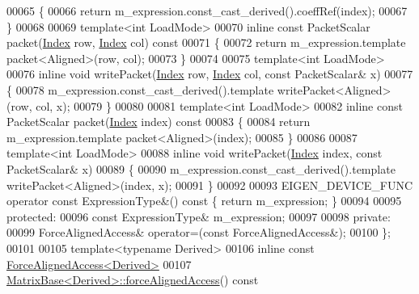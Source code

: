 \begin{DoxyCode}
00065     \{
00066       \textcolor{keywordflow}{return} m\_expression.const\_cast\_derived().coeffRef(index);
00067     \}
00068 
00069     \textcolor{keyword}{template}<\textcolor{keywordtype}{int} LoadMode>
00070     \textcolor{keyword}{inline} \textcolor{keyword}{const} PacketScalar packet(\hyperlink{namespace_eigen_a62e77e0933482dafde8fe197d9a2cfde}{Index} row, \hyperlink{namespace_eigen_a62e77e0933482dafde8fe197d9a2cfde}{Index} col)\textcolor{keyword}{ const}
00071 \textcolor{keyword}{    }\{
00072       \textcolor{keywordflow}{return} m\_expression.template packet<Aligned>(row, col);
00073     \}
00074 
00075     \textcolor{keyword}{template}<\textcolor{keywordtype}{int} LoadMode>
00076     \textcolor{keyword}{inline} \textcolor{keywordtype}{void} writePacket(\hyperlink{namespace_eigen_a62e77e0933482dafde8fe197d9a2cfde}{Index} row, \hyperlink{namespace_eigen_a62e77e0933482dafde8fe197d9a2cfde}{Index} col, \textcolor{keyword}{const} PacketScalar& x)
00077     \{
00078       m\_expression.const\_cast\_derived().template writePacket<Aligned>(row, col, x);
00079     \}
00080 
00081     \textcolor{keyword}{template}<\textcolor{keywordtype}{int} LoadMode>
00082     \textcolor{keyword}{inline} \textcolor{keyword}{const} PacketScalar packet(\hyperlink{namespace_eigen_a62e77e0933482dafde8fe197d9a2cfde}{Index} index)\textcolor{keyword}{ const}
00083 \textcolor{keyword}{    }\{
00084       \textcolor{keywordflow}{return} m\_expression.template packet<Aligned>(index);
00085     \}
00086 
00087     \textcolor{keyword}{template}<\textcolor{keywordtype}{int} LoadMode>
00088     \textcolor{keyword}{inline} \textcolor{keywordtype}{void} writePacket(\hyperlink{namespace_eigen_a62e77e0933482dafde8fe197d9a2cfde}{Index} index, \textcolor{keyword}{const} PacketScalar& x)
00089     \{
00090       m\_expression.const\_cast\_derived().template writePacket<Aligned>(index, x);
00091     \}
00092 
00093     EIGEN\_DEVICE\_FUNC \textcolor{keyword}{operator} \textcolor{keyword}{const} ExpressionType&() \textcolor{keyword}{const} \{ \textcolor{keywordflow}{return} m\_expression; \}
00094 
00095   \textcolor{keyword}{protected}:
00096     \textcolor{keyword}{const} ExpressionType& m\_expression;
00097 
00098   \textcolor{keyword}{private}:
00099     ForceAlignedAccess& operator=(\textcolor{keyword}{const} ForceAlignedAccess&);
00100 \};
00101 
00105 \textcolor{keyword}{template}<\textcolor{keyword}{typename} Derived>
00106 \textcolor{keyword}{inline} \textcolor{keyword}{const} \hyperlink{group___core___module_class_eigen_1_1_force_aligned_access}{ForceAlignedAccess<Derived>}
00107 \hyperlink{group___core___module_ad2fdb842d9a715f8778d0b33c29cfe49}{MatrixBase<Derived>::forceAlignedAccess}()\textcolor{keyword}{ const}

\end{DoxyCode}
